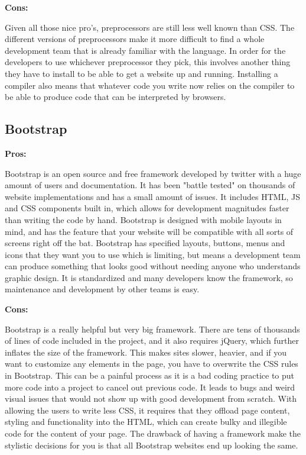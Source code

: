 \documentclass[draftclsnofoot,onecolumn,letterpaper,10pt,compsoc]{IEEEtran}
\begin{document}
    \noindent \textbf{Cons:}

    Given all those nice pro's, preprocessors are still less well known than CSS.
    The different versions of preprocessors make it more difficult to find a whole development team that is already familiar with the language.
    In order for the developers to use whichever preprocessor they pick, this involves another thing they have to install to be able to get a website up and running.
    Installing a compiler also means that whatever code you write now relies on the compiler to be able to produce code that can be interpreted by browsers.


	\subsection{Bootstrap}

    \noindent \textbf{Pros:}

    Bootstrap is an open source and free framework developed by twitter with a huge amount of users and documentation.\cite{bootstrap}
    It has been "battle tested" on thousands of website implementations and has a small amount of issues.
    It includes HTML, JS and CSS components built in, which allows for development magnitudes faster than writing the code by hand.
    Bootstrap is designed with mobile layouts in mind, and has the feature that your website will be compatible with all sorts of screens right off the bat.
    Bootstrap has specified layouts, buttons, menus and icons that they want you to use which is limiting, but means a development team can produce something that looks good without needing anyone who understands graphic design.
    It is standardized and many developers know the framework, so maintenance and development by other teams is easy.

    \noindent \textbf{Cons:}

    Bootstrap is a really helpful but very big framework.
    There are tens of thousands of lines of code included in the project, and it also requires jQuery, which further inflates the size of the framework.
    This makes sites slower, heavier, and if you want to customize any elements in the page, you have to overwrite the CSS rules in Bootstrap.\cite{BootstrapProCon}
    This can be a painful process as it is a bad coding practice to put more code into a project to cancel out previous code.
    It leads to bugs and weird visual issues that would not show up with good development from scratch.
    With allowing the users to write less CSS, it requires that they offload page content, styling and functionality into the HTML, which can create bulky and illegible code for the content of your page.
    The drawback of having a framework make the stylistic decisions for you is that all Bootstrap websites end up looking the same.
\end{document}
